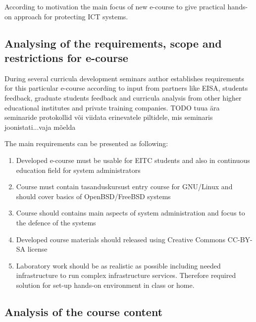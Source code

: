 According to motivation the main focus of new e-course to give practical hands-on approach for protecting \gls{ICT} systems.

\subsection{Analysing of the requirements, scope and restrictions for e-course}
During several curricula development seminars author establishes requirements for this particular e-course according to input from partners like \gls{EISA}, students feedback, graduate students feedback and curricula analysis from other higher educational institutes and private training companies. {\color{red} TODO tuua ära seminaride protokollid või viidata erinevatele piltidele, mis seminaris joonistati...vaja mõelda}


The main requirements can be presented as following:

\begin{enumerate}[label=Requirement \arabic*.,leftmargin=*]
  \item Developed e-course must be usable for \gls{EITC} students and also in continuous education field for system administrators
  \item Course must contain {\color{red} tasanduskursust} entry course for GNU/Linux and should cover basics  of OpenBSD/FreeBSD systems
  \item Course should contains main aspects of system administration and focus to the defence of the systems
  \item Developed course materials should released using Creative Commons \gls{CC-BY-SA} license
  \item Laboratory work should be as realistic as possible including needed infrastructure to run complex infrastructure services. Therefore required solution for set-up hands-on environment in class or home.
\end{enumerate}



\subsection{Analysis of the course content}

